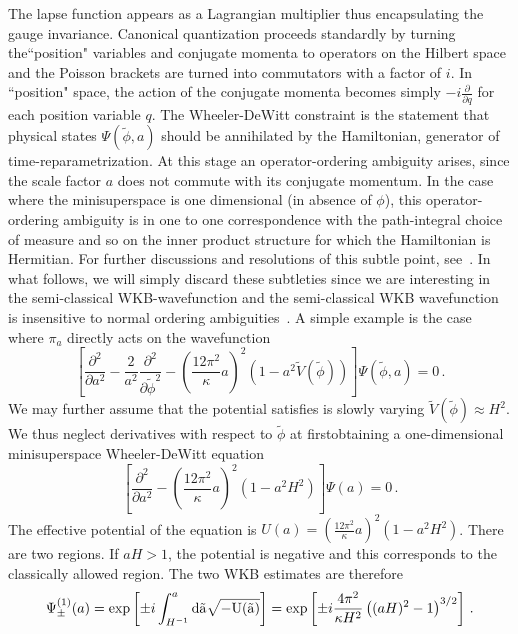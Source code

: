 \documentclass[a4paper,11pt]{article}
\begin{document}
The lapse function appears as a Lagrangian multiplier thus encapsulating the gauge invariance. Canonical quantization proceeds standardly by turning the``position" variables and conjugate momenta to operators on the Hilbert space and the Poisson brackets are turned into commutators with a factor of $i$. In ``position" space, the action of the conjugate momenta becomes simply $-i\frac{\partial}{\partial q}$ for each position variable $q$. The Wheeler-DeWitt constraint is the statement that physical states $\Psi(\tilde{\phi},a)$ should be annihilated by the Hamiltonian, generator of time-reparametrization. At this stage an operator-ordering ambiguity arises, since the scale factor $a$ does not commute with its conjugate momentum. In the case where the minisuperspace is one dimensional (in absence of $\phi$), this operator-ordering ambiguity is in one to one correspondence with the path-integral choice of measure and so on the inner product structure for which the Hamiltonian is Hermitian. For further discussions and resolutions of this subtle point, see~\cite{Kaimakkamis:2024lkb}. In what follows, we will simply discard these subtleties since we are interesting in the semi-classical WKB-wavefunction and the semi-classical WKB wavefunction is insensitive to normal ordering ambiguities~\cite{Vilenkin:1987kf}. A simple example is the case where $\pi_a$ directly acts on the wavefunction
\begin{equation}\label{eq:WdWfinal}
    \left[\frac{\partial^2}{\partial a^2}-\frac{2}{a^2}\frac{\partial^2}{\partial \tilde{\phi}^2}-\left(\frac{12\pi^2}{\kappa}a\right)^2 \left(1-a^2\tilde{V}(\tilde{\phi})\right)\right]\Psi(\tilde{\phi},a)=0\,.
\end{equation}
We may further assume that the potential satisfies is slowly varying $\tilde{V}(\tilde{\phi}) \approx H^2$. We thus neglect derivatives with respect to $\tilde{\phi}$ at firstobtaining a one-dimensional minisuperspace Wheeler-DeWitt equation
\begin{equation}
    \left[\frac{\partial^2}{\partial a^2}-\left(\frac{12\pi^2}{\kappa}a\right)^2 \left(1-a^2 H^2\right)\right]\Psi(a)=0\,.
\end{equation}
The effective potential of the equation is $U(a) = \left(\frac{12\pi^2}{\kappa}a\right)^2 \left(1-a^2H^2\right)$. There are two regions. If $aH>1$, the potential is negative and this corresponds to the classically allowed region. The two WKB estimates are therefore
\begin{equation}
    \Psi^{(1)}_{\pm}(a) = \exp\left[\pm i\int_{H^{-1}}^a \rm{d} \tilde{a}\sqrt{-U(\tilde{a})}\right] = \exp\left[\pm i\frac{4\pi^2}{\kappa H^2}\left((aH)^2-1\right)^{3/2}\right]\,.
\end{equation}
\end{document}
